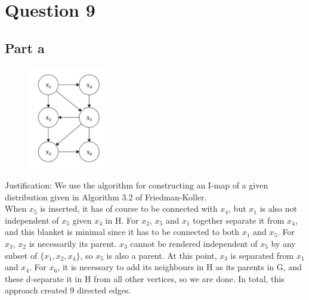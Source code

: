 \section{Question 9}
\subsection{Part a}
\begin{figure}[H]
    \centering
    \includegraphics[width=0.3\textwidth]{../images/BN_Q9.png}  
\end{figure}
Justification: We use the algorithm for constructing an I-map of a given distribution given in Algorithm 3.2 of Friedman-Koller.\\
When $x_5$ is inserted, it has of course to be connected with $x_4$, but $x_1$ is also not independent of $x_5$ given $x_4$ in H. For $x_2$, $x_5$ and $x_1$ together separate it from $x_4$, and this blanket is minimal since it has to be connected to both $x_1$ and $x_5$. For $x_3$, $x_2$ is necessarily its parent. $x_3$ cannot be rendered independent of $x_5$ by any subset of $\{x_1, x_2, x_4\}$, so $x_5$ is also a parent. At this point, $x_3$ is separated from $x_1$ and $x_4$. For $x_6$, it is necessary to add its neighbours in H as its parents in G, and these d-separate it in H from all other vertices, so we are done.
In total, this approach created 9 directed edges.

